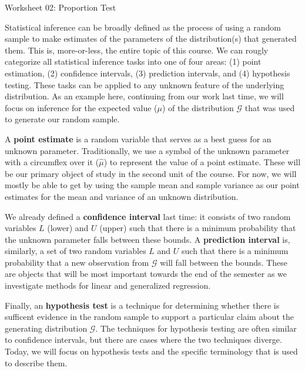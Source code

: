 \documentclass[12pt]{article}
\begin{document}
{\large Worksheet 02: Proportion Test}

\vspace*{18pt}
Statistical inference can be broadly defined as the process of using a
random sample to make estimates of the parameters of the distribution(s)
that generated them. This is, more-or-less, the entire topic of this
course. We can rougly categorize all statistical inference tasks into
one of four areas: (1) point estimation, (2) confidence intervals,
(3) prediction intervals, and (4) hypothesis testing. These tasks can
be applied to any unknown feature of the underlying distribution. As
an example here, continuing from our work last time, we will focus on
inference for the expected value ($\mu$) of the distribution $\mathcal{G}$
that was used to generate our random sample.

A \textbf{point estimate} is a random variable that serves as a best
guess for an unknown parameter. Traditionally, we use a symbol of the
unknown parameter with a circumflex over it ($\hat{\mu}$) to represent
the value of a point estimate. These will be our primary object of study
in the second unit of the course. For now, we will mostly be able to get
by using the sample mean and sample variance as our point estimates for
the mean and variance of an unknown distribution.

We already defined a \textbf{confidence interval} last time: it consists
of two random variables $L$ (lower) and $U$ (upper) such that there is a
minimum probability that the unknown parameter falls between these bounds.
A \textbf{prediction interval} is, similarly, a set of two random variables
$L$ and $U$ such that there is a minimum probability that a new observation
from $\mathcal{G}$ will fall between the bounds. These are objects that 
will be most important towards the end of the semester as we investigate
methods for linear and generalized regression.

Finally, an \textbf{hypothesis test} is a technique for determining whether
there is sufficent evidence in the random sample to support a particular
claim about the generating distribution $\mathcal{G}$. The techniques for
hypothesis testing are often similar to confidence intervals, but there are
cases where the two techniques diverge. Today, we will focus on hypothesis
tests and the specific terminology that is used to describe them.
\end{document}
